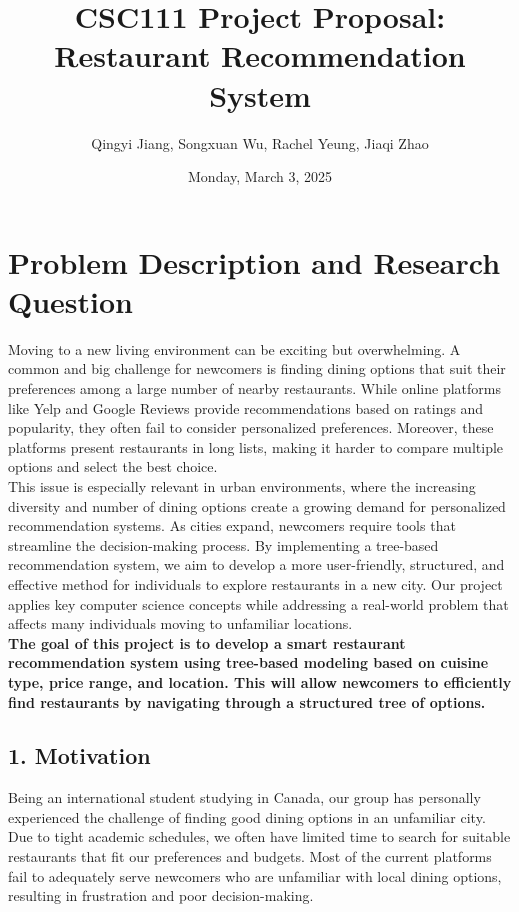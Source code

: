 \documentclass[fontsize=11pt]{article}
\title{CSC111 Project Proposal: Restaurant Recommendation System}
\author{Qingyi Jiang, Songxuan Wu, Rachel Yeung, Jiaqi Zhao}
\date{Monday, March 3, 2025}
\begin{document}
\maketitle

\section*{Problem Description and Research Question}
Moving to a new living environment can be exciting but overwhelming. A common and big challenge for newcomers is finding dining options that suit their preferences among a large number of nearby restaurants. While online platforms like Yelp and Google Reviews provide recommendations based on ratings and popularity, they often fail to consider personalized preferences. Moreover, these platforms present restaurants in long lists, making it harder to compare multiple options and select the best choice. \\
This issue is especially relevant in urban environments, where the increasing diversity and number of dining options create a growing demand for personalized recommendation systems. As cities expand, newcomers require tools that streamline the decision-making process. By implementing a tree-based recommendation system, we aim to develop a more user-friendly, structured, and effective method for individuals to explore restaurants in a new city. Our project applies key computer science concepts while addressing a real-world problem that affects many individuals moving to unfamiliar locations. \\
\textbf{The goal of this project is to develop a smart restaurant recommendation system using tree-based modeling based on cuisine type, price range, and location. This will allow newcomers to efficiently find restaurants by navigating through a structured tree of options.}

\subsection*{1. Motivation}
Being an international student studying in Canada, our group has personally experienced the challenge of finding good dining options in an unfamiliar city. Due to tight academic schedules, we often have limited time to search for suitable restaurants that fit our preferences and budgets. Most of the current platforms fail to adequately serve newcomers who are unfamiliar with local dining options, resulting in frustration and poor decision-making.
\end{document}
